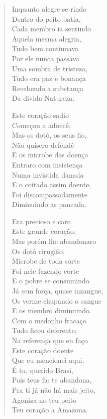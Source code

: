 \begin{verse}
Inquanto alegre se rindo\\
Dentro do peito batia,\\
Cada membro ia sentindo\\
Aquela mesma alegria,\\
Tudo bem continuava\\
Por ele nunca passava\\
Uma sombra de tristeza,\\
Tudo era paz e bonança\\
Recebendo a substança\\
Da divida Natureza.

Este coração sadio\\
Começou a adoecê,\\
Mas os dotô, os seus fio,\\
Não quisero defendê\\
E os microbe das doença\\
Entraro com insistença\\
Numa invistida danada\\
E o coitado assim doente,\\
Foi discompassadamente\\
Diminuindo as pancada.

Era precioso e caro\\
Este grande coração,\\
Mas porém lhe abandonaro\\
Os dotô cirugião,\\
Microbe de toda sorte\\
Foi nele fazendo corte\\
E o pobre se consumindo\\
Já sem força, quase inzangue,\\
Os verme chupando o sangue\\
E os membro diminuindo.\\

Com o medonho fracaço\\
Tudo ficou deferente;\\
Na referença que eu faço\\
Este coração doente\\
Que eu mencionei aqui,\\
É tu, querido Brasi,\\
Pois teus fio te abandona,\\
Pra ti já não há mais jeito,\\
Agoniza no teu peito\\
Teu coração a Amazona.
\end{verse}

